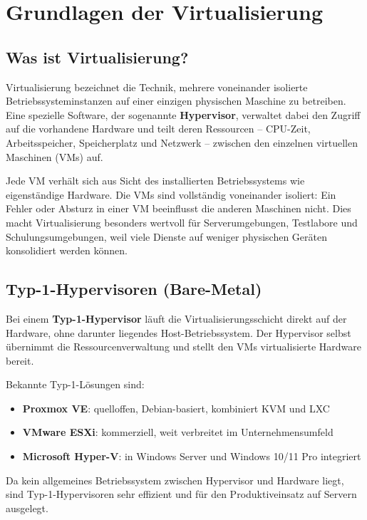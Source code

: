 \documentclass[11pt, oneside, numbers=noenddot]{scrbook}
\begin{document}

\tableofcontents
{}



\chapter{Grundlagen der Virtualisierung}

\section{Was ist Virtualisierung?}
Virtualisierung bezeichnet die Technik, mehrere voneinander isolierte Betriebssysteminstanzen auf einer einzigen physischen Maschine zu betreiben. Eine spezielle Software, der sogenannte \textbf{Hypervisor}, verwaltet dabei den Zugriff auf die vorhandene Hardware und teilt deren Ressourcen -- CPU-Zeit, Arbeitsspeicher, Speicherplatz und Netzwerk -- zwischen den einzelnen virtuellen Maschinen (VMs) auf.

Jede VM verhält sich aus Sicht des installierten Betriebssystems wie eigenständige Hardware. Die VMs sind vollständig voneinander isoliert: Ein Fehler oder Absturz in einer VM beeinflusst die anderen Maschinen nicht. Dies macht Virtualisierung besonders wertvoll für Serverumgebungen, Testlabore und Schulungsumgebungen, weil viele Dienste auf weniger physischen Geräten konsolidiert werden können.

\section{Typ-1-Hypervisoren (Bare-Metal)}
Bei einem \textbf{Typ-1-Hypervisor} läuft die Virtualisierungsschicht direkt auf der Hardware, ohne darunter liegendes Host-Betriebssystem. Der Hypervisor selbst übernimmt die Ressourcenverwaltung und stellt den VMs virtualisierte Hardware bereit.

Bekannte Typ-1-Lösungen sind:
\begin{itemize}
  \item \textbf{Proxmox VE}: quelloffen, Debian-basiert, kombiniert KVM und LXC
  \item \textbf{VMware ESXi}: kommerziell, weit verbreitet im Unternehmensumfeld
  \item \textbf{Microsoft Hyper-V}: in Windows Server und Windows 10/11 Pro integriert
\end{itemize}

Da kein allgemeines Betriebssystem zwischen Hypervisor und Hardware liegt, sind Typ-1-Hypervisoren sehr effizient und für den Produktiveinsatz auf Servern ausgelegt.
\end{document}
